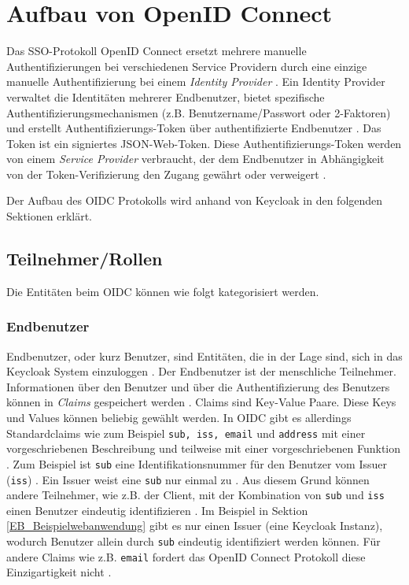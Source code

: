 \section{Aufbau von OpenID Connect}

Das SSO-Protokoll OpenID Connect ersetzt mehrere manuelle Authentifizierungen bei verschiedenen Service Providern durch eine einzige manuelle Authentifizierung bei einem \textit{Identity Provider} \cite{mladenov2016security}. Ein Identity Provider verwaltet die Identitäten mehrerer Endbenutzer, bietet spezifische Authentifizierungsmechanismen (z.B. Benutzername/Passwort oder 2-Faktoren) und erstellt Authentifizierungs-Token über authentifizierte Endbenutzer \cite{mladenov2016security}. Das Token ist ein signiertes JSON-Web-Token. Diese Authentifizierungs-Token werden von einem \textit{Service Provider} verbraucht, der dem Endbenutzer in Abhängigkeit von der Token-Verifizierung den Zugang gewährt oder verweigert \cite{mladenov2016security}.

Der Aufbau des OIDC Protokolls wird anhand von Keycloak in den folgenden Sektionen erklärt.

\subsection{Teilnehmer/Rollen}

Die Entitäten beim OIDC können wie folgt kategorisiert werden.

\subsubsection{Endbenutzer} \label{EB_End-Benutzer}

Endbenutzer, oder kurz Benutzer, sind Entitäten, die in der Lage sind, sich in das Keycloak System einzuloggen \cite[Core Concepts and Terms]{keycloakDocs}. Der Endbenutzer ist der menschliche Teilnehmer. Informationen über den Benutzer und über die Authentifizierung des Benutzers können in \textit{Claims} gespeichert werden \cite[Terminology]{EB4}. Claims sind Key-Value Paare. Diese Keys und Values können beliebig gewählt werden. In OIDC gibt es allerdings Standardclaims wie zum Beispiel \texttt{sub, iss, email} und \texttt{address} mit einer vorgeschriebenen Beschreibung und teilweise mit einer vorgeschriebenen Funktion \cite[Standard Claims]{EB4}. Zum Beispiel ist \texttt{sub} eine Identifikationsnummer für den Benutzer vom Issuer (\texttt{iss}) \cite[Standard Claims]{EB4}. Ein Issuer weist eine \texttt{sub} nur einmal zu \cite[Claim Stability]{EB4}. Aus diesem Grund können andere Teilnehmer, wie z.B. der Client, mit der Kombination von \texttt{sub} und \texttt{iss} einen Benutzer eindeutig identifizieren \cite[Claim Stability]{EB4}. Im Beispiel in Sektion \ref{EB_Beispielwebanwendung} gibt es nur einen Issuer (eine Keycloak Instanz), wodurch Benutzer allein durch \texttt{sub} eindeutig identifiziert werden können. Für andere Claims wie z.B. \texttt{email} fordert das OpenID Connect Protokoll diese Einzigartigkeit nicht \cite[Claim Stability]{EB4}.

